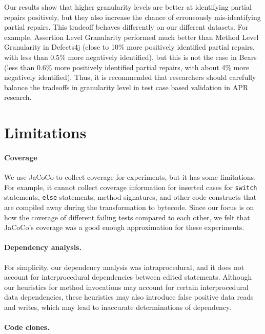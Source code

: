 \documentclass[sigconf, timestamp-false, anonymous=true]{acmart}
\begin{document}
Our results show that higher granularity levels are better at identifying partial repairs positively, 
but they also increase the chance of erroneously mis-identifying partial repairs. 
This tradeoff behaves differently on our different datasets. For example,
Assertion Level Granularity performed much better than Method Level Granularity
in Defects4j (close to 10\% more positively identified partial repairs, with less than
0.5\% more negatively identified), but this is not the case in Bears (less than 0.6\%
more positively identified partial repairs, with about 4\% more negatively identified).
Thus, it is recommended that researchers should 
carefully balance the tradeoffs in granularity level in test case based validation
in APR research.


\section{Limitations}

\paragraph{Coverage}

We use JaCoCo to collect coverage for experiments, but it has some
limitations. For example, it cannot collect coverage information for inserted
cases for \texttt{switch} statements, \texttt{else} statements, method
signatures, and other code constructs that are compiled away during the
transformation to bytecode. Since our focus is on how the coverage of different
failing tests compared to each other, we felt that JaCoCo's coverage was a good
enough approximation for these experiments.

\paragraph{Dependency analysis.}
For simplicity, our dependency analysis was intraprocedural, and it
does not account for interprocedural dependencies between edited statements.  Although our
heuristics for method invocations may account for certain interprocedural data
dependencies, these heuristics may also introduce false positive data reads and
writes, which may lead to inaccurate determinations of dependency.

\paragraph{Code clones.}
\end{document}
